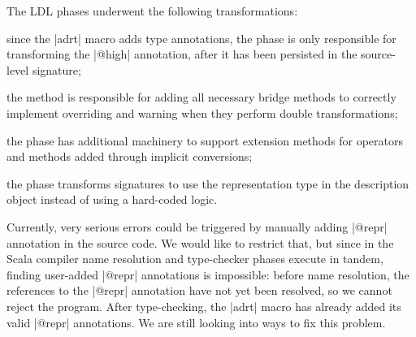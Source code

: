 The LDL phases underwent the following transformations:
\begin{compactitem}
\item since the |adrt| macro adds type annotations, the \inject{} phase is only responsible for transforming the |@high| annotation, after it has been persisted in the source-level signature;
\item the \bridge{} method is responsible for adding all necessary bridge methods to correctly implement overriding and warning when they perform double transformations;
\item the \coerce{} phase has additional machinery to support extension methods for operators and methods added through implicit conversions;
\item the \commit{} phase transforms signatures to use the representation type in the description object instead of using a hard-coded logic.
\end{compactitem}

Currently, very serious errors could be triggered by manually adding |@repr| annotation in the source code. We would like to restrict that, but since in the Scala compiler name resolution and type-checker phases execute in tandem, finding user-added |@repr| annotations is impossible: before name resolution, the references to the |@repr| annotation have not yet been resolved, so we cannot reject the program. After type-checking, the |adrt| macro has already added its valid |@repr| annotations. We are still looking into  ways to fix this problem.
